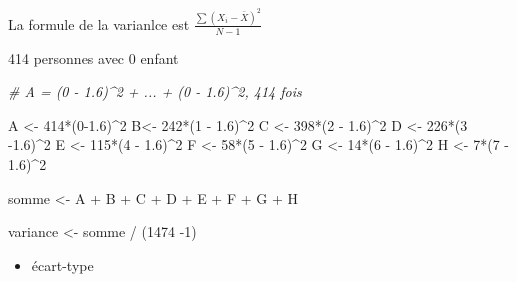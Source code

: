 \documentclass[
]{article}
\newenvironment{Shaded}{\begin{snugshade}}{\end{snugshade}}
\newcommand{\CommentTok}[1]{\textcolor[rgb]{0.56,0.35,0.01}{\textit{#1}}}
\newcommand{\DecValTok}[1]{\textcolor[rgb]{0.00,0.00,0.81}{#1}}
\newcommand{\FloatTok}[1]{\textcolor[rgb]{0.00,0.00,0.81}{#1}}
\newcommand{\NormalTok}[1]{#1}
\newcommand{\OtherTok}[1]{\textcolor[rgb]{0.56,0.35,0.01}{#1}}
\newcommand{\SpecialCharTok}[1]{\textcolor[rgb]{0.00,0.00,0.00}{#1}}
\providecommand{\tightlist}{%
  \setlength{\itemsep}{0pt}\setlength{\parskip}{0pt}}
\begin{document}
La formule de la varianlce est \(\frac{\sum(X_i - \bar{X})^2}{N-1}\)

414 personnes avec 0 enfant

\begin{Shaded}
\begin{Highlighting}[]
\CommentTok{\# A = (0 {-} 1.6)\^{}2 + ... + (0 {-} 1.6)\^{}2, 414 fois}

\NormalTok{A }\OtherTok{\textless{}{-}} \DecValTok{414}\SpecialCharTok{*}\NormalTok{(}\DecValTok{0}\FloatTok{{-}1.6}\NormalTok{)}\SpecialCharTok{\^{}}\DecValTok{2}
\NormalTok{B}\OtherTok{\textless{}{-}} \DecValTok{242}\SpecialCharTok{*}\NormalTok{(}\DecValTok{1} \SpecialCharTok{{-}} \FloatTok{1.6}\NormalTok{)}\SpecialCharTok{\^{}}\DecValTok{2}
\NormalTok{C }\OtherTok{\textless{}{-}} \DecValTok{398}\SpecialCharTok{*}\NormalTok{(}\DecValTok{2} \SpecialCharTok{{-}} \FloatTok{1.6}\NormalTok{)}\SpecialCharTok{\^{}}\DecValTok{2}
\NormalTok{D }\OtherTok{\textless{}{-}} \DecValTok{226}\SpecialCharTok{*}\NormalTok{(}\DecValTok{3} \SpecialCharTok{{-}}\FloatTok{1.6}\NormalTok{)}\SpecialCharTok{\^{}}\DecValTok{2}
\NormalTok{E }\OtherTok{\textless{}{-}} \DecValTok{115}\SpecialCharTok{*}\NormalTok{(}\DecValTok{4} \SpecialCharTok{{-}} \FloatTok{1.6}\NormalTok{)}\SpecialCharTok{\^{}}\DecValTok{2}
\NormalTok{F }\OtherTok{\textless{}{-}} \DecValTok{58}\SpecialCharTok{*}\NormalTok{(}\DecValTok{5} \SpecialCharTok{{-}} \FloatTok{1.6}\NormalTok{)}\SpecialCharTok{\^{}}\DecValTok{2}
\NormalTok{G }\OtherTok{\textless{}{-}} \DecValTok{14}\SpecialCharTok{*}\NormalTok{(}\DecValTok{6} \SpecialCharTok{{-}} \FloatTok{1.6}\NormalTok{)}\SpecialCharTok{\^{}}\DecValTok{2}
\NormalTok{H }\OtherTok{\textless{}{-}} \DecValTok{7}\SpecialCharTok{*}\NormalTok{(}\DecValTok{7} \SpecialCharTok{{-}} \FloatTok{1.6}\NormalTok{)}\SpecialCharTok{\^{}}\DecValTok{2}

\NormalTok{somme }\OtherTok{\textless{}{-}}\NormalTok{ A }\SpecialCharTok{+}\NormalTok{ B }\SpecialCharTok{+}\NormalTok{ C }\SpecialCharTok{+}\NormalTok{ D }\SpecialCharTok{+}\NormalTok{ E }\SpecialCharTok{+}\NormalTok{ F }\SpecialCharTok{+}\NormalTok{ G }\SpecialCharTok{+}\NormalTok{ H}

\NormalTok{variance }\OtherTok{\textless{}{-}}\NormalTok{ somme }\SpecialCharTok{/}\NormalTok{ (}\DecValTok{1474} \SpecialCharTok{{-}}\DecValTok{1}\NormalTok{)}
\end{Highlighting}
\end{Shaded}

\begin{itemize}
\tightlist
\item
  écart-type
\end{itemize}
\end{document}

